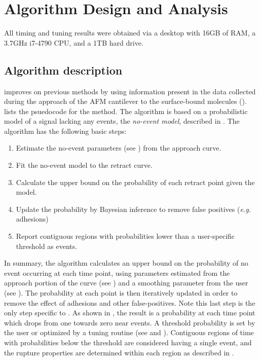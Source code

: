 \section{Algorithm Design and Analysis}

All timing and tuning results were obtained via a desktop with 16GB of RAM, a 3.7GHz i7-4790 CPU, and a 1TB hard drive. 

\subsection{Algorithm description}

\name{} improves on previous methods by using information present in the data collected during the approach of the AFM cantilever to the surface-bound molecules ().   lists the psuedocode for the method. The algorithm is based on a probabilistic model of a signal lacking any events, the \textit{no-event model}, described in . The algorithm has the following basic steps:

\begin{enumerate}
\item Estimate the no-event parameters (see ) from the approach curve.
\item Fit the no-event model to the retract curve.
\item Calculate the upper bound on the probability of each retract point given the model.
\item Update the probability by Bayesian inference to remove false positives (\textit{e.g.} \singlemol{} adhesions)
\item Report contiguous regions with probabilities lower than a user-specific threshold as events.
\end{enumerate}

 In summary, the algorithm calculates an upper bound on the probability of no event occurring at each time point, using parameters estimated from the approach portion of the curve (see ) and a smoothing parameter from the user (see ). The probability at each point is then iteratively updated in order to remove the effect of adhesions and other false-positives. Note this last step is the only step specific to \singlemol{}. As shown in , the result is a probability at each time point which drops from one towards zero near events. A threshold probability is set by the user or optimized by a tuning routine (see  and ). Contiguous regions of time with probabilities below the threshold are considered having a single event, and the rupture properties are determined within each region as described in .


